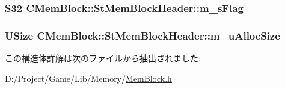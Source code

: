 \subsubsection[{m\+\_\+s\+Flag}]{\setlength{\rightskip}{0pt plus 5cm}S32 C\+Mem\+Block\+::\+St\+Mem\+Block\+Header\+::m\+\_\+s\+Flag}\label{struct_c_mem_block_1_1_st_mem_block_header_a03465c909a135c3df47c8fd29d6d1e62}
\hypertarget{struct_c_mem_block_1_1_st_mem_block_header_a6196b148899e1e848178ac0fb4558631}{}
\subsubsection[{m\+\_\+u\+Alloc\+Size}]{\setlength{\rightskip}{0pt plus 5cm}U\+Size C\+Mem\+Block\+::\+St\+Mem\+Block\+Header\+::m\+\_\+u\+Alloc\+Size}\label{struct_c_mem_block_1_1_st_mem_block_header_a6196b148899e1e848178ac0fb4558631}


この構造体詳解は次のファイルから抽出されました\+:\begin{DoxyCompactItemize}
\item 
D\+:/\+Project/\+Game/\+Lib/\+Memory/\hyperlink{_mem_block_8h}{Mem\+Block.\+h}\end{DoxyCompactItemize}
